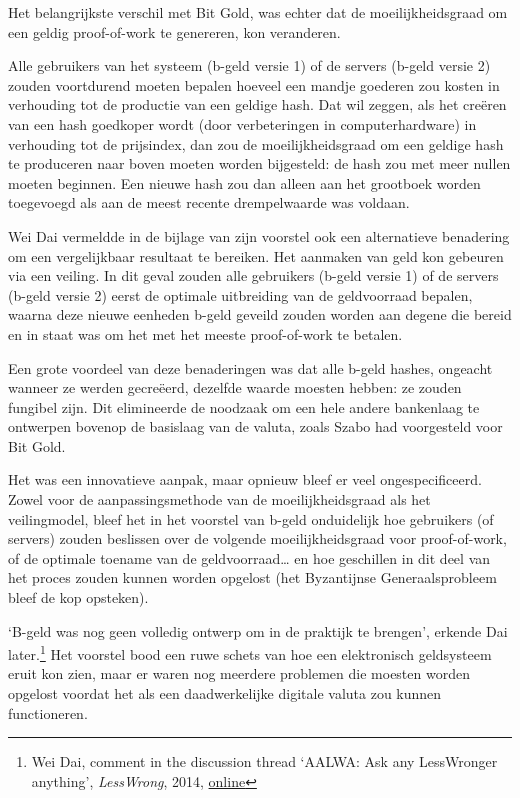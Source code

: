 \documentclass[smalldemyvopaper,11pt,twoside,onecolumn,openright,extrafontsizes,hidelinks]{memoir}
\begin{document}
Het belangrijkste verschil met Bit Gold, was echter dat de
moeilijkheidsgraad om een geldig proof-of-work te genereren, kon
veranderen.

Alle gebruikers van het systeem (b-geld versie 1) of de servers (b-geld
versie 2) zouden voortdurend moeten bepalen hoeveel een mandje goederen
zou kosten in verhouding tot de productie van een geldige hash. Dat wil
zeggen, als het creëren van een hash goedkoper wordt (door verbeteringen
in computerhardware) in verhouding tot de prijsindex, dan zou de
moeilijkheidsgraad om een geldige hash te produceren naar boven moeten
worden bijgesteld: de hash zou met meer nullen moeten beginnen. Een
nieuwe hash zou dan alleen aan het grootboek worden toegevoegd als aan
de meest recente drempelwaarde was voldaan.

Wei Dai vermeldde in de bijlage van zijn voorstel ook een alternatieve
benadering om een vergelijkbaar resultaat te bereiken. Het aanmaken van
geld kon gebeuren via een veiling. In dit geval zouden alle gebruikers
(b-geld versie 1) of de servers (b-geld versie 2) eerst de optimale
uitbreiding van de geldvoorraad bepalen, waarna deze nieuwe eenheden
b-geld geveild zouden worden aan degene die bereid en in staat was om
het met het meeste proof-of-work te betalen.

Een grote voordeel van deze benaderingen was dat alle b-geld hashes,
ongeacht wanneer ze werden gecreëerd, dezelfde waarde moesten hebben: ze
zouden fungibel zijn. Dit elimineerde de noodzaak om een hele andere
bankenlaag te ontwerpen bovenop de basislaag van de valuta, zoals Szabo
had voorgesteld voor Bit Gold.

Het was een innovatieve aanpak, maar opnieuw bleef er veel
ongespecificeerd. Zowel voor de aanpassingsmethode van de
moeilijkheidsgraad als het veilingmodel, bleef het in het voorstel van
b-geld onduidelijk hoe gebruikers (of servers) zouden beslissen over de
volgende moeilijkheidsgraad voor proof-of-work, of de optimale toename
van de geldvoorraad\ldots{} en hoe geschillen in dit deel van het proces
zouden kunnen worden opgelost (het Byzantijnse Generaalsprobleem bleef
de kop opsteken).

`B-geld was nog geen volledig ontwerp om in de praktijk te brengen',
erkende Dai later.\footnote{Wei Dai, comment in the discussion thread
  `AALWA: Ask any LessWronger anything', \emph{LessWrong}, 2014,
  \href{https://www.lesswrong.com/posts/YdfpDyRpNyypivgdu/aalwa-ask-any-lesswronger-anything}{online}}
Het voorstel bood een ruwe schets van hoe een elektronisch geldsysteem
eruit kon zien, maar er waren nog meerdere problemen die moesten worden
opgelost voordat het als een daadwerkelijke digitale valuta zou kunnen
functioneren.
\end{document}
